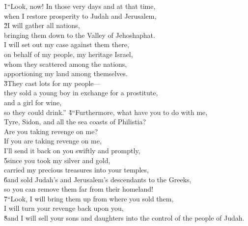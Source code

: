 \begin{poetry}
\poeml {}
\v{1}``Look, now! In those very days and at that time, \\
\poeml when I restore prosperity to Judah and Jerusalem, \\
\poeml \v{2}I will gather all nations, \\
\poemll    bringing them down to the Valley of Jehoshaphat. \\
\poeml I will set out my case against them there, \\
\poemll    on behalf of my people, my heritage Israel, \\
\poeml whom they scattered among the nations, \\
\poemll    apportioning my land among themselves. \\
\poeml \v{3}They cast lots for my people--- \\
\poemll    they sold a young boy in exchange for a prostitute, \\
\poeml and a girl for wine, \\
\poemll    so they could drink.''
\poeml \v{4}``Furthermore, what have you to do with me, \\
\poemll    Tyre, Sidon, and all the sea coasts of Philistia? \\
\poemlll       Are you taking revenge on me? \\
\poeml If you are taking revenge on me, \\
\poemll    I'll send it back on you swiftly and promptly, \\
\poeml \v{5}since you took my silver and gold, \\
\poemll    carried my precious treasures into your temples, \\
\poeml \v{6}and sold Judah's and Jerusalem's descendants to the Greeks, \\
\poemll    so you can remove them far from their homeland! \\
\poeml \v{7}``Look, I will bring them up from where you sold them, \\
\poemll    I will turn your revenge back upon you, \\
\poeml \v{8}and I will sell your sons and daughters into the control of the people of Judah. \\

\end{poetry}
